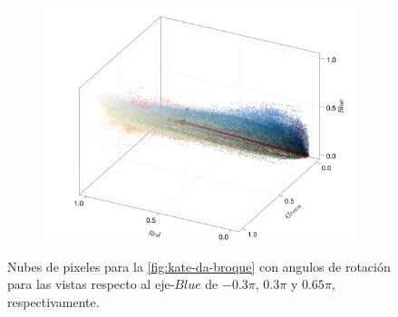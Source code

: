 \begin{figure}[ht!]
\begin{subfigure}[c]{0.3\textwidth}
        \centering
        \includegraphics[scale=0.09]{../figures/pixel_cloud_kate_3}
    \end{subfigure}
    \caption{Nubes de pixeles para la \cref{fig:kate-da-broque} con angulos de rotación para las vistas respecto al eje-$Blue$ de $-0.3\pi$, $0.3\pi$ y $0.65\pi$, respectivamente.}
    \label{fig:nube-pixeles-kate}
\end{figure}

